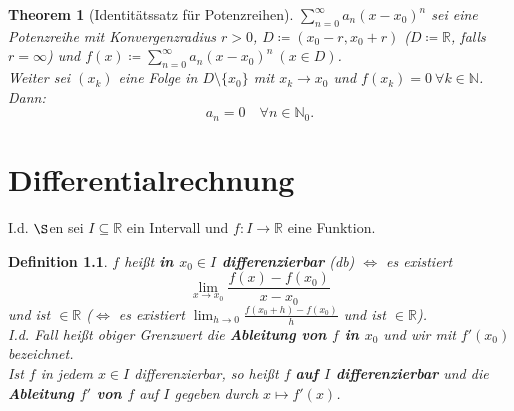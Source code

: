 \documentclass[12pt]{extreport} %
\newcommand{\N}{\mathbb{N}}
\newcommand{\R}{\mathbb{R}}
\theoremstyle{named}
\newtheorem{unnamedtheorem}{Theorem} \counterwithin{unnamedtheorem}{chapter}
\theoremstyle{dotless}
\newtheorem*{definition}{Definition}
\begin{document}
\begin{unnamedtheorem}[Identitätssatz für Potenzreihen] \label{8.4:prop-IdentitätssatzFürPotenzreihe}
	$\sum_{n=0}^{\infty} a_{n} (x - x_{0})^{n}$ sei eine Potenzreihe mit Konvergenzradius $r > 0$, $D \coloneqq (x_{0} - r, x_{0} + r)$ ($D \coloneqq \R$, falls $r = \infty$) und $f(x) \coloneqq \sum_{n=0}^{\infty} a_{n} (x - x_{0})^{n} ~(x \in D)$. \\
	Weiter sei $(x_{k})$ eine Folge in $D \setminus \{ x_{0} \}$ mit $x_{k} \rightarrow x_{0}$ und $f(x_{k}) = 0 ~\forall k \in \N$. Dann:
	$$ a_{n} = 0 \quad \forall n \in \N_{0}. $$ 
\end{unnamedtheorem}


\newpage


\chapter{Differentialrechnung}

I.d. $\S$en sei $I \subseteq \R$ ein Intervall und $f \colon I \rightarrow \R$ eine Funktion. 


 
\begin{definition}
	$f$ hei{\ss}t \textbf{in $x_{0} \in I$ differenzierbar} (db) $\iff$ es existiert
		$$\lim_{x \rightarrow x_{0}} \frac{f(x) - f(x_{0})}{x - x_{0}} $$
	und ist $\in \R$ ($\iff$ es existiert $\lim_{h \rightarrow 0} \frac{f(x_{0} + h) - f(x_{0})}{h}$ und ist $\in \R$). \\
	I.d. Fall hei{\ss}t obiger Grenzwert die \textbf{Ableitung von $f$ in $x_{0}$} und wir mit $f'(x_{0})$ bezeichnet. \\
	Ist $f$ in jedem $x \in I$ differenzierbar, so hei{\ss}t $f$ \textbf{auf $I$ differenzierbar} und die \textbf{Ableitung $f'$ von $f$} auf $I$ gegeben durch $x \mapsto f'(x)$.
\end{definition}
\end{document}
